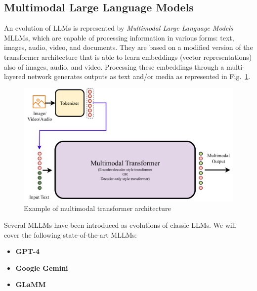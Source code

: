 \subsection{Multimodal Large Language Models}
An evolution of LLMs is represented by \textit{Multimodal Large Language Models} MLLMs, which are capable of processing information in various forms: text, images, audio, video, and documents.
They are based on a modified version of the transformer architecture that is able to learn embeddings (vector representations) also of images, audio, and video. 
Processing these embeddings through a multi-layered network generates outputs as text and/or media \cite{wadekar2024evolution} as represented in Fig.~\ref{fig:21}.
\begin{figure}[H]
    \centering
    \includegraphics[width=0.9\linewidth]{Figures/fig_21.png}
    \caption{Example of multimodal transformer architecture}
    \label{fig:21}
\end{figure}



Several MLLMs have been introduced as evolutions of classic LLMs.
We will cover the following state-of-the-art MLLMs:
\begin{itemize}
    \item \textbf{GPT-4}
    \item \textbf{Google Gemini} 
    \item \textbf{GLaMM}
\end{itemize}

